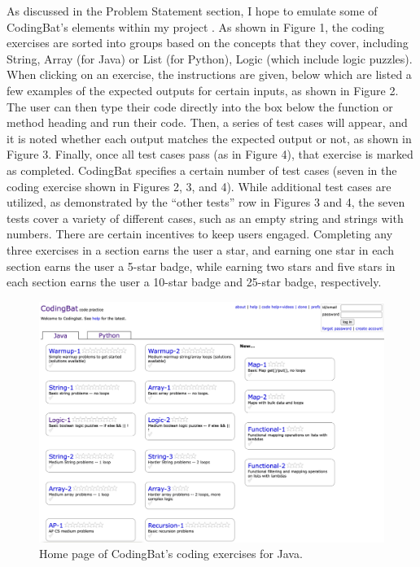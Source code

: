 \documentclass[10pt,twocolumn]{article}
\begin{document}
As discussed in the Problem Statement section, I hope to emulate some of CodingBat’s elements within my project \cite{CodingBat}. As shown in Figure 1, the coding exercises are sorted into groups based on the concepts that they cover, including String, Array (for Java) or List (for Python), Logic (which include logic puzzles). When clicking on an exercise, the instructions are given, below which are listed a few examples of the expected outputs for certain inputs, as shown in Figure 2. The user can then type their code directly into the box below the function or method heading and run their code. Then, a series of test cases will appear, and it is noted whether each output matches the expected output or not, as shown in Figure 3. Finally, once all test cases pass (as in Figure 4), that exercise is marked as completed. CodingBat specifies a certain number of test cases (seven in the coding exercise shown in Figures 2, 3, and 4). While additional test cases are utilized, as demonstrated by the “other tests” row in Figures 3 and 4, the seven tests cover a variety of different cases, such as an empty string and strings with numbers. There are certain incentives to keep users engaged. Completing any three exercises in a section earns the user a star, and earning one star in each section earns the user a 5-star badge, while earning two stars and five stars in each section earns the user a 10-star badge and 25-star badge, respectively.

\begin{figure}
    \centering
    \includegraphics[width=.95\linewidth]{CodingBat0.png}
    \caption{
        Home page of CodingBat's coding exercises for Java.
    }
    \label{fig:first-page}
\end{figure}
\end{document}
